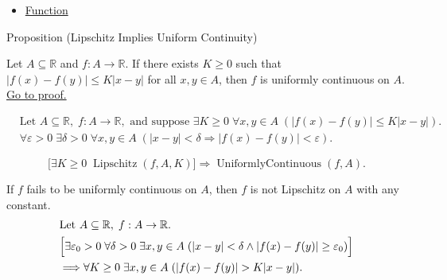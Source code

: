\begin{dependencies}
\begin{itemize}
  \item \hyperref[def:function]{Function}
\end{itemize}
\end{dependencies}

\begin{propositionbox}{Proposition (Lipschitz Implies Uniform Continuity)}
\begin{proposition}
\label{prop:lipschitz-implies-uc}
Let $A \subseteq \mathbb{R}$ and $f:A \to \mathbb{R}$. If there exists $K \ge 0$ such that $|f(x)-f(y)| \le K |x-y|$ for all $x,y \in A$, then $f$ is uniformly continuous on $A$.
\hyperref[prf:lipschitz-implies-uc]{Go to proof.}
\end{proposition}
\end{propositionbox}

\begin{remark*}
\[
\begin{aligned}
&\text{Let } A \subseteq \mathbb{R},\; f:A \to \mathbb{R},\text{ and suppose }\exists K \ge 0\;\forall x,y \in A\;( |f(x)-f(y)| \le K |x-y|).\\
&\forall \varepsilon > 0\;\exists \delta > 0\;\forall x,y \in A\;(|x-y| < \delta \Rightarrow |f(x)-f(y)| < \varepsilon).
\end{aligned}
\]
\end{remark*}

\begin{remark*}
\[
\bigl[\exists K \ge 0\; \operatorname{Lipschitz}(f,A,K)\bigr] \Rightarrow \operatorname{UniformlyContinuous}(f,A).
\]
\end{remark*}

\begin{remark*}
If $f$ fails to be uniformly continuous on $A$, then $f$ is not Lipschitz on $A$ with any constant.
\[
\begin{aligned}
&\text{Let } A \subseteq \mathbb{R},\; f:A \to \mathbb{R}.\\
&\Bigl[\exists \varepsilon_0>0\;\forall \delta>0\;\exists x,y \in A\;(|x-y|<\delta \land |f(x)-f(y)|\ge\varepsilon_0)\Bigr]\\
&\Longrightarrow \forall K\ge 0\;\exists x,y \in A\;(|f(x)-f(y)|>K|x-y|).
\end{aligned}
\]
\end{remark*}

